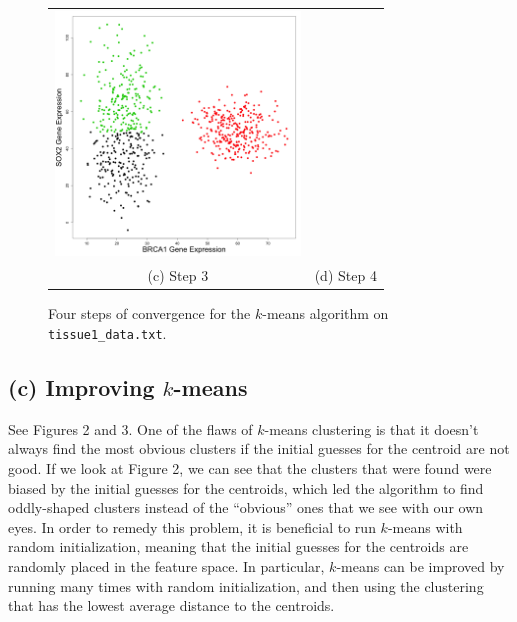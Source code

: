 \documentclass[11pt]{article}
\begin{document}
\begin{figure}
\begin{tabular}{c c}
    \includegraphics[width=65mm]{../tissue1_plots/cluster_step4.png} \\
    (c) Step 3 & (d) Step 4 \\
\end{tabular}
\caption{Four steps of convergence for the $k$-means algorithm
on {\tt tissue1\_data.txt}.}
\end{figure}

\subsection*{(c) Improving $k$-means}
See Figures 2 and 3. One of the flaws of $k$-means clustering is
that it doesn't always find the most obvious clusters if the
initial guesses for the centroid are not good. If we look at
Figure 2, we can see that the clusters that were found were biased
by the initial guesses for the centroids, which led the algorithm
to find oddly-shaped clusters instead of the ``obvious'' ones that
we see with our own eyes. In order to remedy
this problem, it is beneficial to run $k$-means with random initialization,
meaning that the initial guesses for the centroids are randomly
placed in the feature space. In particular, $k$-means can be improved
by running many times with random initialization, and then using
the clustering that has the lowest average distance to the centroids.
\end{document}
